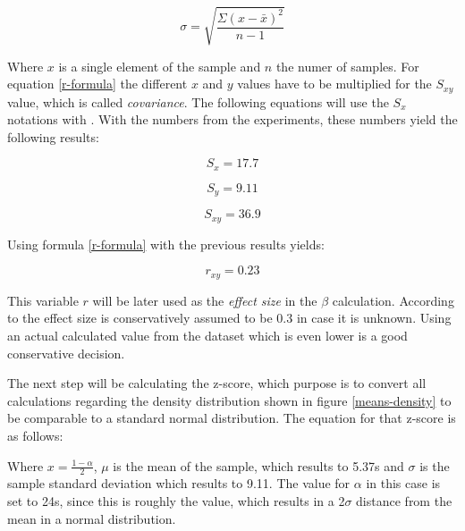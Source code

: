             \begin{equation}\label{stddev}
                \sigma = \sqrt{\frac{\Sigma(x-\bar{x})^{2}}{n-1}}
            \end{equation}            
            
            Where $x$ is a single element of the sample and $n$ the numer of samples. For equation \ref*{r-formula} the different $x$ and $y$ values have to be multiplied for the $S_{xy}$ value, which is called \textit{covariance}. The following equations will use the $S_{x}$ notations with . With the numbers from the experiments, these numbers yield the following results:

            \begin{equation}\label{sx}
                S_{x} = 17.7
            \end{equation} 

            \begin{equation}\label{sy}
                S_{y} = 9.11
            \end{equation}

            \begin{equation}\label{sxy}
                S_{xy} = 36.9
            \end{equation}
            
            Using formula \ref*{r-formula} with the previous results yields:

            \begin{equation}\label{r-value}
                r_{xy} = 0.23
            \end{equation}

            This variable $r$ will be later used as the \textit{effect size} in the $\beta$ calculation. According to \cite{Sciencing.10102021} the effect size is conservatively assumed to be 0.3 in case it is unknown. Using an actual calculated value from the dataset which is even lower is a good conservative decision.

            \medskip

            The next step will be calculating the z-score, which purpose is to convert all calculations regarding the density distribution shown in figure \ref*{means-density} to be comparable to a standard normal distribution. The equation for that z-score is as follows:

          

            Where $x=\frac{1-\alpha}{2}$, $\mu$ is the mean of the sample, which results to 5.37s and $\sigma$ is the sample standard deviation which results to 9.11. The value for $\alpha$ in this case is set to 24s, since this is roughly the value, which results in a 2$\sigma$ distance from the mean in a normal distribution.

